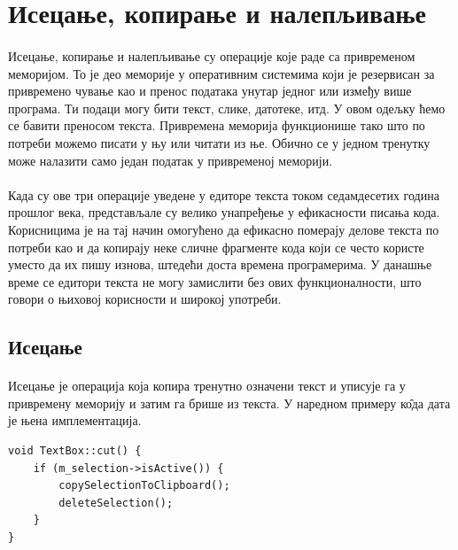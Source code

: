 \documentclass[12pt,oneside]{memoir}
\begin{document}
\section{Исецање, копирање и налепљивање}
\paragraph{}
Исецање, копирање и налепљивање су операције које раде са привременом меморијом. 
То је део меморије у оперативним системима који је резервисан за привремено чување 
као и пренос података унутар једног или између више програма. Ти подаци могу бити текст,
слике, датотеке, итд. У овом одељку ћемо се бавити преносом текста. Привремена 
меморија функционише тако што по потреби можемо писати у њу или читати из ње. 
Обично се у једном тренутку може налазити само један податак у привременој меморији.

\paragraph{}
Када су ове три операције уведене у едиторе текста током седамдесетих година 
прошлог века, представљале су велико унапређење у ефикасности писања кода.
Корисницима је на тај начин омогућено да ефикасно померају делове текста по потреби као
и да копирају неке сличне фрагменте кода који се често користе уместо да их
пишу изнова, штедећи доста времена програмерима. У данашње време се едитори текста не
могу замислити без ових функционалности, што говори о њиховој корисности и широкој
употреби.

\subsection{Исецање}
\paragraph{}
Исецање је операција која копира тренутно означени текст и уписује га у 
привремену меморију и затим га брише из текста. У наредном примеру к\^{о}да дата је њена
имплементација.

\begin{verbatim}
void TextBox::cut() {
	if (m_selection->isActive()) {
		copySelectionToClipboard();
		deleteSelection();
	}
}
\end{verbatim}
\end{document}
